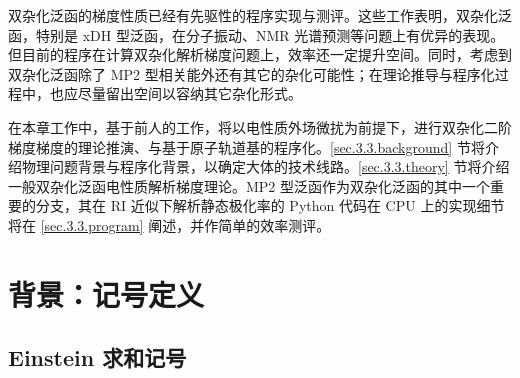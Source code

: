 双杂化泛函的梯度性质已经有先驱性的程序实现与测评\cite{Neese-Grimme.JCP.2007, Biczysko-Barone.JCTC.2010, Su-Xu.JCC.2013, Stoychev-Neese.JCTC.2018, Gu-Xu.JCTC.2021, Yan-Xu.JCTC.2022}。这些工作表明，双杂化泛函，特别是 xDH 型泛函，在分子振动、NMR 光谱预测等问题上有优异的表现。但目前的程序在计算双杂化解析梯度问题上，效率还一定提升空间。同时，考虑到双杂化泛函除了 MP2 型相关能外还有其它的杂化可能性；在理论推导与程序化过程中，也应尽量留出空间以容纳其它杂化形式。

在本章工作中，基于前人的工作\cite{Gerratt-Mills.JCP.1968, Gerratt-Mills.JCP.1968a, Pople-Binkley.IJQC.1979, Dykstra-Jasien.CPL.1984, Handy-Schaefer.JCP.1984, Handy-Simandiras.CPL.1985, Pulay-Saeboe.TCA.1986, Trucks-Bartlett.CPL.1988, Frisch-Pople.CP.1990, Frisch-Pople.CPL.1990, Frisch-Pople.CPL.1990a, Gauss-Bartlett.JCP.1992, Stanton-Bartlett.CPL.1992, Johnson-Frisch.CPL.1993, Head-Gordon-Head-Gordon.CPL.1994, Yamaguchi-Schaefer.Oxford.1994, Weigend-Haeser.TCA.1997, Aikens-Gordon.TCA.2003, Cammi-Frisch.TCA.2004, Distasio-Head-Gordon.JCC.2007, Neese-Grimme.JCP.2007, Biczysko-Barone.JCTC.2010, Su-Xu.JCC.2013, Ji-Jung.JCTC.2013, Bykov-Neese.MP.2015, Stoychev-Neese.JCTC.2018, Gu-Xu.JCTC.2021, Yan-Xu.JCTC.2022}，将以电性质外场微扰为前提下，进行双杂化二阶梯度梯度的理论推演、与基于原子轨道基的程序化。\ref{sec.3.3.background} 节将介绍物理问题背景与程序化背景，以确定大体的技术线路。\ref{sec.3.3.theory} 节将介绍一般双杂化泛函电性质解析梯度理论。MP2 型泛函作为双杂化泛函的其中一个重要的分支，其在 RI 近似下解析静态极化率的 Python 代码在 CPU 上的实现细节将在 \ref{sec.3.3.program} 阐述，并作简单的效率测评。

\section{背景：记号定义}

\subsection{Einstein 求和记号}

